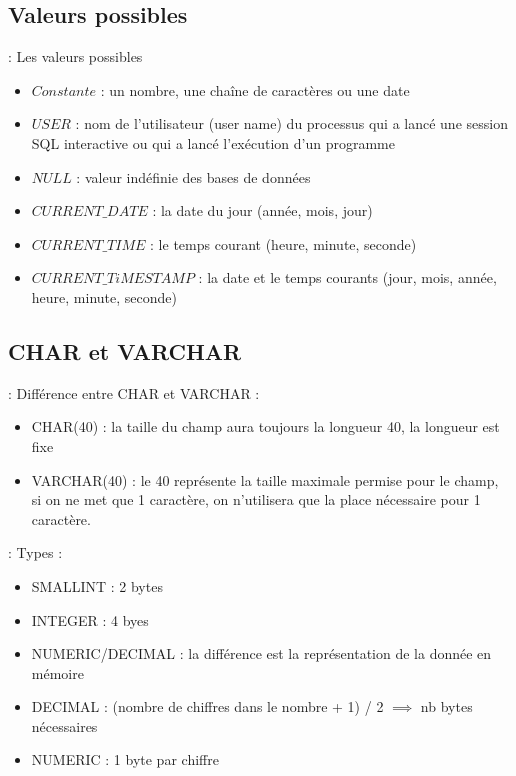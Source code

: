 \documentclass[10pt]{beamer}
\begin{document}
\subsection{Valeurs possibles}
\begin{frame}{\secname : \subsecname}
    Les valeurs possibles
    \begin{itemize}
        \item $Constante$ :   un nombre, une chaîne de caractères ou une date
        \item $USER$ :         nom de l'utilisateur (user name) du processus qui a lancé une session SQL interactive ou qui a lancé l'exécution d'un programme
        \item $NULL$ :         valeur indéfinie des bases de données
        \item $CURRENT\_DATE$ : la date du jour (année, mois, jour)
        \item $CURRENT\_TIME$ : le temps courant (heure, minute, seconde)
        \item $CURRENT\_TiMESTAMP$ : la date et le temps courants (jour, mois, année, heure, minute, seconde)
    \end{itemize}
\end{frame}

\subsection{CHAR et VARCHAR}
\begin{frame}{\secname : \subsecname}
    Différence entre CHAR et VARCHAR :
    \begin{itemize}
        \item CHAR(40) : la taille du champ aura toujours la longueur 40, la longueur est fixe
        \item VARCHAR(40) : le 40 représente la taille maximale permise pour le champ, si on ne met que 1 caractère, on n'utilisera que la place nécessaire pour 1 caractère.
    \end{itemize}
\end{frame}

\begin{frame}{\secname : \subsecname}
    Types :
    \begin{itemize}
        \item SMALLINT : 2 bytes
        \item INTEGER : 4 byes
        \item NUMERIC/DECIMAL : la différence est la représentation de la donnée en mémoire
        \item DECIMAL : (nombre de chiffres dans le nombre + 1) / 2 $\implies$ nb bytes nécessaires
        \item NUMERIC : 1 byte par chiffre
    \end{itemize}
\end{frame}
\end{document}

